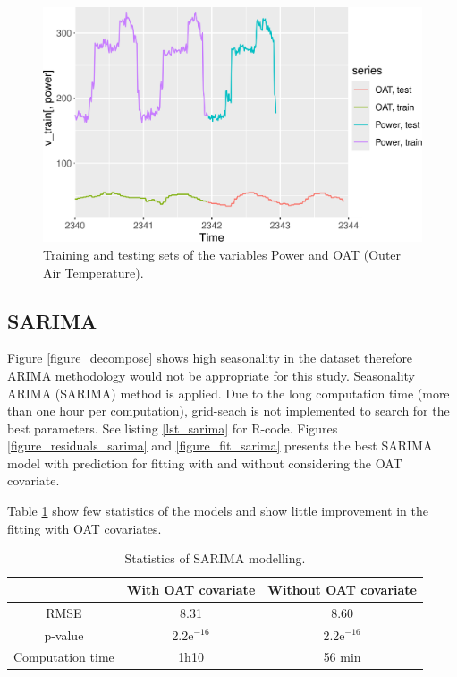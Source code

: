 \begin{figure}[H]
\centering
 \includegraphics[scale=0.6]{figures/train_test_set.png}
\caption{Training and testing sets of the variables Power and OAT (Outer Air Temperature).}
\label{figure_train_test_set}
\end{figure}


\subsection{SARIMA}
Figure \ref{figure_decompose} shows high seasonality in the dataset therefore ARIMA methodology 
would not be appropriate for this study. Seasonality ARIMA (SARIMA) method is applied. Due to the 
long computation time (more than one hour per computation), grid-seach is not implemented to 
search for the best parameters. See listing \ref{lst_sarima} for R-code. Figures 
\ref{figure_residuals_sarima} and \ref{figure_fit_sarima} presents the best SARIMA model with 
prediction for fitting with and without considering the OAT covariate.

Table \ref{table_sarima} show few statistics of the models and show little improvement in the 
fitting with OAT covariates.

\begin{table}[H]
\centering \begin{tabular}{c|cc}
                 & With OAT covariate & Without OAT covariate\\\hline\hline
RMSE             &  8.31     &  8.60 \\
p-value          & 2.2e$^{-16}$ &  2.2e$^{-16}$ \\
Computation time &  1h10     &  56 min \\
\end{tabular}
\caption{Statistics of SARIMA modelling.}
\label{table_sarima}
\end{table}

